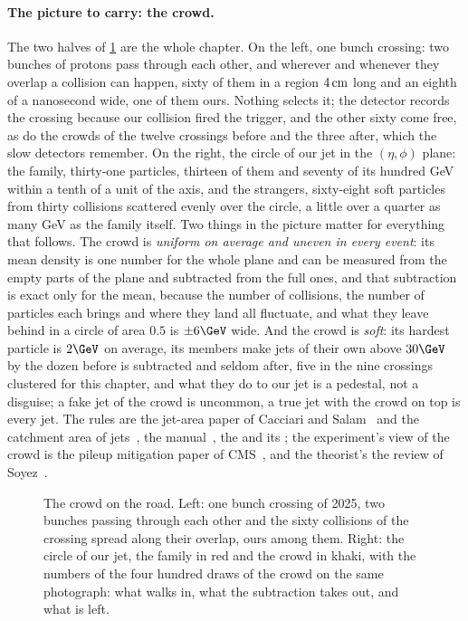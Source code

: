 \paragraph{The picture to carry: the crowd.}
The two halves of \cref{fig:crowd_on_the_road:crowd_sketch} are the whole
chapter. On the left, one bunch crossing: two bunches of protons pass
through each other, and wherever and whenever they overlap a collision
can happen, sixty of them in a region $4\,\mathrm{cm}$ long and an eighth of a
nanosecond wide, one of them ours. Nothing selects it; the detector
records the crossing because our collision fired the trigger, and the
other sixty come free, as do the crowds of the twelve crossings before
and the three after, which the slow detectors remember. On the right, the
circle of our jet in the $(\eta,\phi)$ plane: the family, thirty-one
particles, thirteen of them and seventy of its hundred GeV within a tenth
of a unit of the axis, and the strangers, sixty-eight soft particles from
thirty collisions scattered evenly over the circle, a little over a
quarter as many GeV as the family itself. Two things in
the picture matter for everything that follows. The crowd is
\emph{uniform on average and uneven in every event}: its mean density
\rhoPU is one number for the whole plane and can be measured from the
empty parts of the plane and subtracted from the full ones, and that
subtraction is exact only for the mean, because the number of collisions,
the number of particles each brings and where they land all fluctuate,
and what they leave behind in a circle of area $0.5$ is $\pm6\GeV$ wide.
And the crowd is \emph{soft}: its hardest particle is $2\GeV$ on average,
its members make jets of their own above $30\GeV$ by the dozen before
\rhoPU is subtracted and seldom after, five in the nine crossings
clustered for this chapter, and what they do to our jet is a pedestal,
not a disguise; a fake jet of the crowd is uncommon, a true jet with the
crowd on top is every jet. The rules are the jet-area paper of Cacciari
and Salam~\cite{Cacciari:2007fd} and the catchment area of
jets~\cite{Cacciari:2008gn}, the \FASTJET manual~\cite{Cacciari:2011ma},
the \CMSSW \Mix and its ; the experiment's
view of the crowd is the pileup mitigation paper of
CMS~\cite{CMS:2020ebo}, and the theorist's the review of
Soyez~\cite{Soyez:2018opl}.

\begin{figure}[htbp]\centering
\resizebox{\textwidth}{!}{}
\caption[The crowd on the road: one bunch crossing, and the circle of our
jet with the strangers inside]{The crowd on the road. Left: one bunch
crossing of 2025, two bunches passing through each other and the sixty
collisions of the crossing spread along their overlap, ours among them.
Right: the circle of our jet, the family in red and the crowd in khaki,
with the numbers of the four hundred draws of the crowd on the same
photograph: what walks in, what the subtraction takes out, and what is
left.}
\label{fig:crowd_on_the_road:crowd_sketch}
\end{figure}

